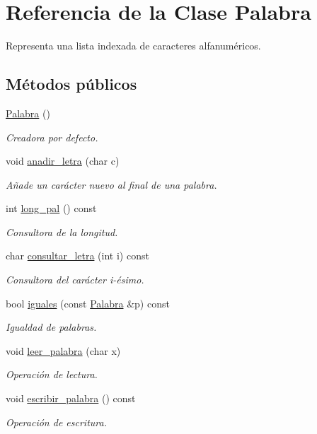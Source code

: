 \hypertarget{class_palabra}{\section{Referencia de la Clase Palabra}
\label{class_palabra}
}


Representa una lista indexada de caracteres alfanuméricos.  


\subsection*{Métodos públicos}
\begin{DoxyCompactItemize}
\item 
\hyperlink{class_palabra_a8e74f02e148cdcb5bb91bc2ae193183e}{Palabra} ()
\begin{DoxyCompactList}\small\item\em Creadora por defecto. \end{DoxyCompactList}\item 
void \hyperlink{class_palabra_af5ff11094169feb67dc7d367e91b346a}{anadir\-\_\-letra} (char c)
\begin{DoxyCompactList}\small\item\em Añade un carácter nuevo al final de una palabra. \end{DoxyCompactList}\item 
int \hyperlink{class_palabra_a12b9671d02253db0b9e99dd2ddd26588}{long\-\_\-pal} () const 
\begin{DoxyCompactList}\small\item\em Consultora de la longitud. \end{DoxyCompactList}\item 
char \hyperlink{class_palabra_af17b4fea06a303870ab726134908fa3d}{consultar\-\_\-letra} (int i) const 
\begin{DoxyCompactList}\small\item\em Consultora del carácter i-\/ésimo. \end{DoxyCompactList}\item 
bool \hyperlink{class_palabra_a15381207ba29efc2989acc0700423ae8}{iguales} (const \hyperlink{class_palabra}{Palabra} \&p) const 
\begin{DoxyCompactList}\small\item\em Igualdad de palabras. \end{DoxyCompactList}\item 
void \hyperlink{class_palabra_a49969a4abf120a384a8b62e61b0b1809}{leer\-\_\-palabra} (char x)
\begin{DoxyCompactList}\small\item\em Operación de lectura. \end{DoxyCompactList}\item 
void \hyperlink{class_palabra_a3745b2efe36f7fc64fd226285953314f}{escribir\-\_\-palabra} () const 
\begin{DoxyCompactList}\small\item\em Operación de escritura. \end{DoxyCompactList}\end{DoxyCompactItemize}
